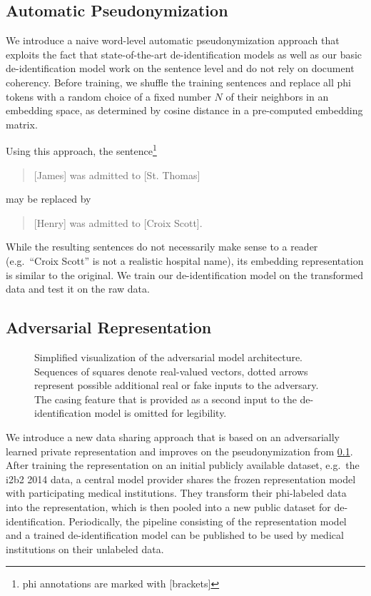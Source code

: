 \subsection{Automatic Pseudonymization}\label{sec:automatic-pseudonymization}
%
We introduce a naive word-level automatic pseudonymization approach that exploits the fact that state-of-the-art de-identification models \citep{liu2017identification,dernoncourt2017identification} as well as our basic de-identification model work on the sentence level and do not rely on document coherency.
%
Before training, we shuffle the training sentences and replace all \ac{phi} tokens with a random choice of a fixed number $N$ of their neighbors in an embedding space, as determined by cosine distance in a pre-computed embedding matrix.

%
Using this approach, the sentence\footnote{\ac{phi} annotations are marked with [brackets]}
%
\begin{quote}
    [James] was admitted to [St. Thomas]
\end{quote}
%
may be replaced by
\begin{quote}
    [Henry] was admitted to [Croix Scott].
\end{quote}
%
While the resulting sentences do not necessarily make sense to a reader (e.g.\ ``Croix Scott'' is not a realistic hospital name), its embedding representation is similar to the original.
%
We train our de-identification model on the transformed data and test it on the raw data.


\subsection{Adversarial Representation}\label{sec:adversarial-representation}

\begin{figure}
    \centering
    
    \caption[Adversarial model architecture]{%
        Simplified visualization of the adversarial model architecture.
        Sequences of squares denote real-valued vectors, dotted arrows represent possible additional real or fake inputs to the adversary.
        The casing feature that is provided as a second input to the de-identification model is omitted for legibility.}\label{fig:adversarial-model}
\end{figure}

%
We introduce a new data sharing approach that is based on an adversarially learned private representation and improves on the pseudonymization from \cref{sec:automatic-pseudonymization}.
%
After training the representation on an initial publicly available dataset, e.g.\ the i2b2 2014 data, a central model provider shares the frozen representation model with participating medical institutions.
%
They transform their \ac{phi}-labeled data into the representation, which is then pooled into a new public dataset for de-identification.
%
Periodically, the pipeline consisting of the representation model and a trained de-identification model can be published to be used by medical institutions on their unlabeled data.

